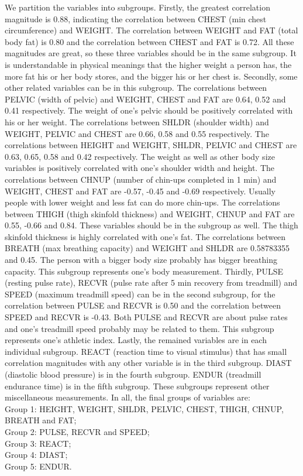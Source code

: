 \documentclass[10pt]{article}
\begin{document}
We partition the variables into subgroups. Firstly, the greatest correlation magnitude is 0.88, indicating the correlation between CHEST (min chest circumference) and WEIGHT. The correlation between WEIGHT and FAT (total body fat) is 0.80 and the correlation between CHEST and FAT is 0.72. All these magnitudes are great, so these three variables should be in the same subgroup. It is understandable in physical meanings that the higher weight a person has, the more fat his or her body stores, and the bigger his or her chest is. Secondly, some other related variables can be in this subgroup. The correlations between PELVIC (width of pelvic) and WEIGHT, CHEST and FAT are 0.64, 0.52 and 0.41 respectively. The weight of one's pelvic should be positively correlated with his or her weight. The correlations between SHLDR (shoulder width) and WEIGHT, PELVIC and CHEST are 0.66, 0.58 and 0.55 respectively. The correlations between HEIGHT and WEIGHT, SHLDR, PELVIC and CHEST are 0.63, 0.65, 0.58 and 0.42 respectively. The weight as well as other body size variables is positively correlated with one's shoulder width and height. The correlations between CHNUP (number of chin-ups completed in 1 min) and WEIGHT, CHEST and FAT are -0.57, -0.45 and -0.69 respectively. Usually people with lower weight and less fat can do more chin-ups. The correlations between THIGH (thigh skinfold thickness) and WEIGHT, CHNUP and FAT are 0.55, -0.66 and 0.84. These variables should be in the subgroup as well. The thigh skinfold thickness is highly correlated with one's fat. The correlations between BREATH (max breathing capacity) and WEIGHT and SHLDR are 0.58783355 and 0.45. The person with a bigger body size probably has bigger breathing capacity. This subgroup represents one's body measurement. Thirdly, PULSE (resting pulse rate), RECVR (pulse rate after 5 min recovery from treadmill) and SPEED (maximum treadmill speed) can be in the second subgroup, for the correlation between PULSE and RECVR is 0.50 and the correlation between SPEED and RECVR is -0.43. Both PULSE and RECVR are about pulse rates and one's treadmill speed probably may be related to them. This subgroup represents one's athletic index. Lastly, the remained variables are in each individual subgroup. REACT (reaction time to visual stimulus) that has small correlation magnitudes with any other variable is in the third subgroup. DIAST (diastolic blood pressure) is in the fourth subgroup. ENDUR (treadmill endurance time) is in the fifth subgroup. These subgroups represent other miscellaneous measurements. In all, the final groups of variables are:\\
Group 1: HEIGHT, WEIGHT, SHLDR, PELVIC, CHEST, THIGH, CHNUP, BREATH and FAT;\\
Group 2: PULSE, RECVR and SPEED;\\
Group 3: REACT;\\
Group 4: DIAST;\\
Group 5: ENDUR.
\vspace{3mm}
\end{document}
